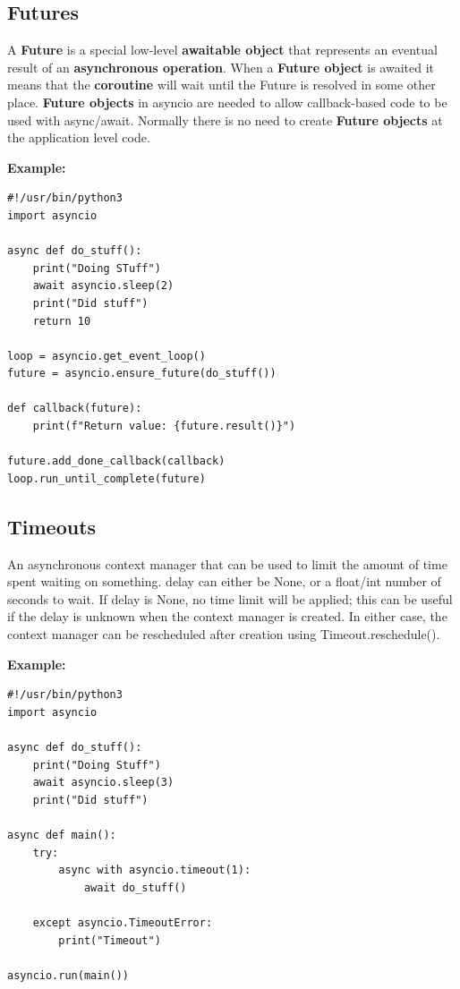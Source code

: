 \documentclass{report}
\begin{document}
    \pagebreak \bigbreak \noindent
    \subsection{Futures}
    A \textbf{Future} is a special low-level \textbf{awaitable object} that represents an eventual result of an \textbf{asynchronous operation}.
     \bigbreak \noindent 
     When a \textbf{Future object} is awaited it means that the \textbf{coroutine} will wait until the Future is resolved in some other place.
    \bigbreak \noindent 
    \textbf{Future objects} in asyncio are needed to allow callback-based code to be used with async/await.
    \bigbreak \noindent 
    Normally there is no need to create \textbf{Future objects} at the application level code.
    \bigbreak \noindent 
    \begin{mdframed}
      \textbf{Example: }
      \begin{verbatim}
#!/usr/bin/python3
import asyncio

async def do_stuff():
    print("Doing STuff")
    await asyncio.sleep(2)
    print("Did stuff")
    return 10

loop = asyncio.get_event_loop()
future = asyncio.ensure_future(do_stuff())

def callback(future):
    print(f"Return value: {future.result()}")

future.add_done_callback(callback)
loop.run_until_complete(future)
      \end{verbatim}
    \end{mdframed}

    \pagebreak \bigbreak \noindent
    \subsection{Timeouts}
    An asynchronous context manager that can be used to limit the amount of time spent waiting on something.
    \bigbreak \noindent 
    delay can either be None, or a float/int number of seconds to wait. If delay is None, no time limit will be applied; this can be useful if the delay is unknown when the context manager is created.
    \bigbreak \noindent 
    In either case, the context manager can be rescheduled after creation using Timeout.reschedule().
    \bigbreak \noindent 
    \begin{mdframed}
      \textbf{Example: }
      \begin{verbatim}
#!/usr/bin/python3
import asyncio

async def do_stuff():
    print("Doing Stuff")
    await asyncio.sleep(3)
    print("Did stuff")

async def main():
    try:
        async with asyncio.timeout(1):
            await do_stuff()

    except asyncio.TimeoutError:
        print("Timeout")

asyncio.run(main())
      \end{verbatim}
    \end{mdframed}
\end{document}
